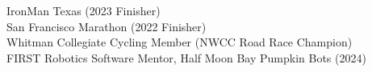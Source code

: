 \documentclass{res}
\begin{document}
\begin{resume}
	\begin{center}
	\begin{varwidth}[t]{\textwidth}
	\raggedright

	IronMan Texas (2023 Finisher)\\
	San Francisco Marathon (2022 Finisher)\\ 
	Whitman Collegiate Cycling Member (NWCC Road Race Champion)\\
	FIRST Robotics Software Mentor, Half Moon Bay Pumpkin Bots (2024)

	\end{varwidth}	
	\end{center}
 
\end{resume} 
\end{document}
